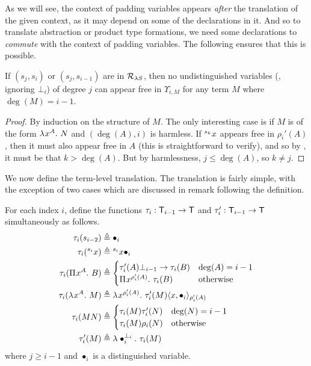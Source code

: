 \documentclass{article}
\begin{document}
As we will see, the context of padding variables appears \textit{after} the translation of the given context, as it may depend on some of the declarations in it.
And so to translate abstraction or product type formations, we need some declarations to \textit{commute} with the context of padding variables.
The following ensures that this is possible.

\begin{lemma}
\label{lem:free-var-upsilon}
If $(s_j, s_i)$ or $(s_j, s_{i - 1})$ are in $\rules_{\lS}$, then no undistinguished variables (\ie, ignoring $\bot_i$) of degree $j$ can appear free in $\Upsilon_{i, M}$ for any term $M$ where $\deg(M) = i - 1$.
\end{lemma}

\begin{proof}
By induction on the structure of $M$.
The only interesting case is if $M$ is of the form $\lambdaT x A N$ and $(\deg(A), i)$ is harmless.
If $\svar k x$ appears free in $\rho_i'(A)$, then it must also appear free in $A$ (this is straightforward to verify), and so by , it must be that $k > \deg(A)$.
But by harmlessness, $j \leq \deg(A)$, so $k \not = j$.
\end{proof}

We now define the term-level translation.
The translation is fairly simple, with the exception of two cases which are discussed in remark following the definition.

\begin{definition}\label{def:tau}
For each index $i$, define the functions $\tau_i : \terms_{i - 1} \to \terms$ and $\tau_i' : \terms_{i - 1} \to \terms$ simultaneously as follows.
\begin{align*}
\tau_i(s_{i - 2}) &\df \bullet_i \\
\tau_i(\svar i x) &\df \svar i x \bullet_i \\
\tau_i(\PiT x A B) &\df
\begin{cases}
    \tau_i'(A)\bot_{i - 1} \to \tau_i(B) & \deg(A) = i - 1 \\
    \PiT x {\rho_i'(A)} {\tau_i(B)} & \ow
\end{cases} \\
\tau_i(\lambdaT x A M) &\df
\lambdaT x {\rho_i'(A)} {\tau_i'(M)\pair[\rho_i'(A)] x {\bullet_i}} \\
\tau_i(MN) &\df
\begin{cases}
    \tau_i(M)\tau_i'(N) & \deg(N) = i - 1 \\
    \tau_i(M)\rho_i(N) & \ow
\end{cases} \\
\tau'_i(M) &\df \lambdaT {\bullet_i} {\bot_i} \tau_i(M)
\end{align*}
where $j \geq i - 1$ and $\bullet_i$ is a distinguished variable.
\end{definition}
\end{document}
